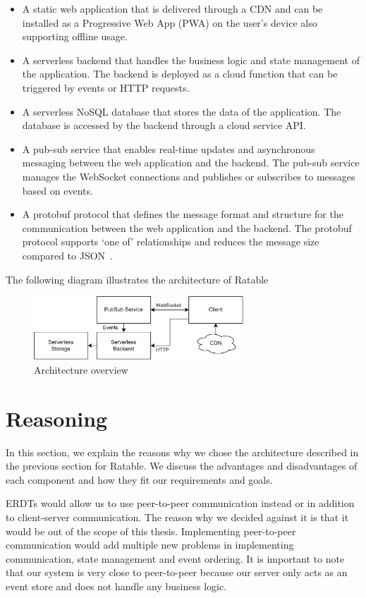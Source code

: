 \documentclass[
	english,
	ruledheaders=section,   %
	class=report,		    %
	thesis={type=bachelor}, %
	accentcolor=9c,			%
	custommargins=true,    %
	marginpar=false,        %
	parskip=half-,          %
	fontsize=11pt,          %
]{tudapub}
\begin{document}
\begin{itemize}
  \item A static web application that is delivered through a CDN and can be installed as a Progressive Web App (PWA) on the user’s device also supporting offline usage.
  \item A serverless backend that handles the business logic and state management of the application. The backend is deployed as a cloud function that can be triggered by events or HTTP requests.
  \item A serverless NoSQL database that stores the data of the application. The database is accessed by the backend through a cloud service API.
  \item A pub-sub service that enables real-time updates and asynchronous messaging between the web application and the backend. The pub-sub service manages the WebSocket connections and publishes or subscribes to messages based on events.
  \item A protobuf protocol that defines the message format and structure for the communication between the web application and the backend. The protobuf protocol supports ‘one of’ relationships and reduces the message size compared to JSON~\cite{protobuf}.
\end{itemize}
The following diagram illustrates the architecture of Ratable

\begin{figure}[h]
  \centering
  \includegraphics[width=0.7\textwidth]{architecture_services.png}
  \caption{Architecture overview}
\end{figure}

\section{Reasoning}
In this section, we explain the reasons why we chose the architecture described in the previous section for Ratable. We discuss the advantages and disadvantages of each component and how they fit our requirements and goals.

ERDTs would allow us to use peer-to-peer communication instead or in addition to client-server communication. The reason why we decided against it is that it would be out of the scope of this thesis. Implementing peer-to-peer communication would add multiple new problems in implementing communication, state management and event ordering. It is important to note that our system is very close to peer-to-peer because our server only acts as an event store and does not handle any business logic.
\end{document}
